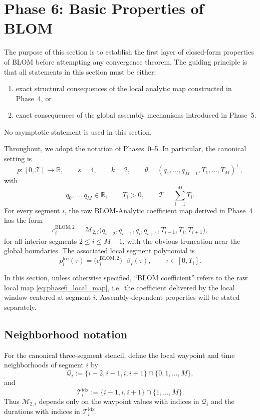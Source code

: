 \section{Phase 6: Basic Properties of BLOM}
\label{sec:phase6_basic_properties}

The purpose of this section is to establish the first layer of closed-form properties of BLOM before attempting any convergence theorem.
The guiding principle is that all statements in this section must be either:
\begin{enumerate}
    \item exact structural consequences of the local analytic map constructed in Phase~4, or
    \item exact consequences of the global assembly mechanisms introduced in Phase~5.
\end{enumerate}
No asymptotic statement is used in this section.

Throughout, we adopt the notation of Phases~0--5.
In particular, the canonical setting is
\[
p:[0,\mathcal T]\to\mathbb R,
\qquad
s=4,\qquad
k=2,
\qquad
\theta=(q_1,\dots,q_{M-1},T_1,\dots,T_M)^\top,
\]
with
\[
q_0,\dots,q_M\in\mathbb R,
\qquad
T_i>0,
\qquad
\mathcal T=\sum_{i=1}^{M}T_i.
\]
For every segment \(i\), the raw BLOM-Analytic coefficient map derived in Phase~4 has the form
\begin{equation}
\label{eq:phase6_local_map}
c_i^{\mathrm{BLOM},2}
=
\mathcal M_{2,i}\bigl(q_{i-2},q_{i-1},q_i,q_{i+1},T_{i-1},T_i,T_{i+1}\bigr),
\end{equation}
for all interior segments \(2\le i\le M-1\), with the obvious truncation near the global boundaries.
The associated local segment polynomial is
\begin{equation}
\label{eq:phase6_segment_poly}
p_i^{\mathrm{loc}}(\tau)
=
\bigl(c_i^{\mathrm{BLOM},2}\bigr)^\top \beta_s(\tau),
\qquad
\tau\in[0,T_i].
\end{equation}

In this section, unless otherwise specified, ``BLOM coefficient'' refers to the raw local map \eqref{eq:phase6_local_map}, i.e.\ the coefficient delivered by the local window centered at segment \(i\).
Assembly-dependent properties will be stated separately.

\subsection{Neighborhood notation}
\label{subsec:phase6_neighborhood_notation}

For the canonical three-segment stencil, define the local waypoint and time neighborhoods of segment \(i\) by
\begin{equation}
\label{eq:phase6_q_neighborhood}
\mathcal Q_i
:=
\{i-2,i-1,i,i+1\}\cap\{0,1,\dots,M\},
\end{equation}
and
\begin{equation}
\label{eq:phase6_T_neighborhood}
\mathcal T_i^{\mathrm{idx}}
:=
\{i-1,i,i+1\}\cap\{1,\dots,M\}.
\end{equation}
Thus \(\mathcal M_{2,i}\) depends only on the waypoint values with indices in \(\mathcal Q_i\) and the durations with indices in \(\mathcal T_i^{\mathrm{idx}}\).

